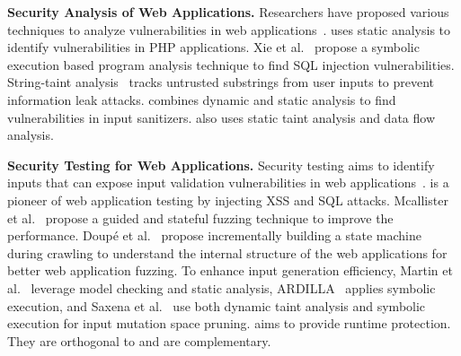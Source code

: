 



\noindent
{\bf Security Analysis of Web Applications.}
Researchers have proposed various techniques to analyze vulnerabilities in web applications~\cite{webssari, xie_aiken, pixy, wassermann_2007,wassermann_2008,minamide_2005, noxes, saner_2008}. 
\cite{webssari} uses static analysis to identify vulnerabilities in PHP applications. 
Xie et al.~\cite{xie_aiken} propose a symbolic execution based program analysis technique to find SQL injection vulnerabilities. %
String-taint analysis~\cite{wassermann_2007,wassermann_2008,minamide_2005} tracks untrusted substrings from user inputs to prevent information leak attacks.
\cite{saner_2008} combines dynamic and static analysis to find vulnerabilities in input sanitizers.
%
\sysname also uses static taint analysis and data flow analysis. %

\noindent
{\bf Security Testing for Web Applications.}
Security testing aims to identify inputs that can expose input validation vulnerabilities in web applications~\cite{survey_bau, huang_2003, mcallister_2008, doupe_2012, martin_2008, kiezun_2009, saxena_2010a, saxena_2010b, saner_2008}. 
\cite{huang_2003} is a pioneer of web application testing by injecting XSS and SQL attacks. Mcallister et al.~\cite{mcallister_2008} propose a guided and stateful fuzzing technique to improve the performance. %
%
Doup\'{e} et al.~\cite{doupe_2012} propose incrementally building a state machine during crawling to understand the internal structure of the web applications for better web application fuzzing. %
To enhance input generation efficiency, Martin et al.~\cite{martin_2008} leverage model checking and static analysis, ARDILLA~\cite{kiezun_2009} applies symbolic execution, and Saxena et al.~\cite{saxena_2010a, saxena_2010b} use both dynamic taint analysis and symbolic execution for input mutation space pruning.
%
\sysname aims to provide runtime protection. They are orthogonal to \sysname and are complementary. 

